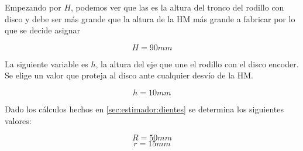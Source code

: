 \documentclass[main_conf.tex]{subfiles}
\begin{document}
Empezando por $H$, podemos ver que las es la altura del tronco
del rodillo con disco y debe ser más grande que la altura de la
HM más grande a fabricar por lo que se decide asignar

$$ H = 90 mm $$

La siguiente variable es $h$, la altura del eje que une el
rodillo con el disco encoder. Se elige un valor que proteja
al disco ante cualquier desvío de la HM.

$$ h = 10 mm $$

Dado los cálculos hechos en \ref{sec:estimador:dientes} se
determina los siguientes valores:

$$ R = 50 mm $$
$$ r = 15 mm $$
\end{document}
